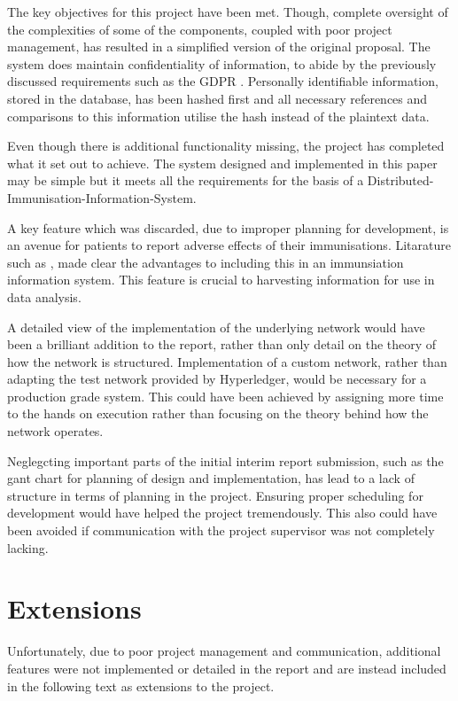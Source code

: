 

The key objectives for this project have been met. 
Though, complete oversight of the complexities of some of the components, coupled with poor project management, has resulted in a simplified version of the original proposal. 
The system does maintain confidentiality of information, to abide by the previously discussed requirements such as the GDPR \cite{noauthor_general_nodate}.
Personally identifiable information, stored in the database, has been hashed first and all necessary references and comparisons to this information utilise the hash instead of the plaintext data. 

Even though there is additional functionality missing, the project has completed what it set out to achieve. 
The system designed and implemented in this paper may be simple but it meets all the requirements for the basis of a Distributed-Immunisation-Information-System.

A key feature which was discarded, due to improper planning for development, is an avenue for patients to report adverse effects of their immunisations. 
Litarature such as \cite{european_centre_for_disease_prevention_and_control_designing_2018}, made clear the advantages to including this in an immunsiation information system. 
This feature is crucial to harvesting information for use in data analysis.

A detailed view of the implementation of the underlying network would have been a brilliant addition to the report, rather than only detail on the theory of how the network is structured. 
Implementation of a custom network, rather than adapting the test network provided by Hyperledger, would be necessary for a production grade system.
This could have been achieved by assigning more time to the hands on execution rather than focusing on the theory behind how the network operates. 

Neglegcting important parts of the initial interim report submission, such as the gant chart for planning of design and implementation, has lead to a lack of structure in terms of planning in the project.
Ensuring proper scheduling for development would have helped the project tremendously. 
This also could have been avoided if communication with the project supervisor was not completely lacking.

\section{Extensions}
Unfortunately, due to poor project management and communication, additional features were not implemented or detailed in the report and are instead included in the following text as extensions to the project.

